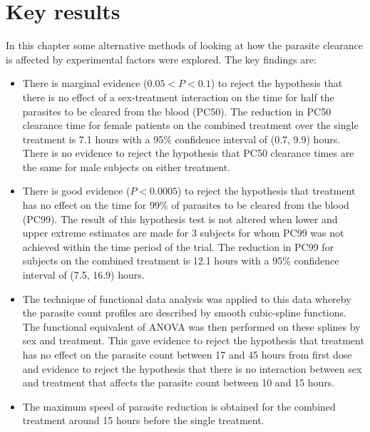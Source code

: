 \section{Key results}
In this chapter some alternative methods of looking at how the parasite clearance is affected by experimental factors were explored. The key findings are:
\begin{itemize}
\item There is marginal evidence ($0.05<P<0.1$) to reject the hypothesis that there is no effect of a sex-treatment interaction on the time for half the parasites to be cleared from the blood (PC50). The reduction in PC50 clearance time for female patients on the combined treatment over the single treatment is 7.1 hours with a 95\% confidence interval of (0.7, 9.9) hours. There is no evidence to reject the hypothesis that PC50 clearance times are the same for male subjects on either treatment.
\item There is good evidence ($P<0.0005$) to reject the hypothesis that treatment has no effect on the time for 99\% of parasites to be cleared from the blood (PC99). The result of this hypothesis test is not altered when lower and upper extreme estimates are made for 3 subjects for whom PC99 was not achieved within the time period of the trial. The reduction in PC99 for subjects on the combined treatment is 12.1 hours with a 95\% confidence interval of (7.5, 16.9) hours.
\item The technique of functional data analysis was applied to this data whereby the parasite count profiles are described by smooth cubic-spline functions. The functional equivalent of ANOVA was then performed on these splines by sex and treatment. This gave evidence to reject the hypothesis that treatment has no effect on the parasite count between 17 and 45 hours from first dose and evidence to reject the hypothesis that there is no interaction between sex and treatment that affects the parasite count between 10 and 15 hours.
\item The maximum speed of parasite reduction is obtained for the combined treatment around 15 hours before the single treatment.
\end{itemize}
